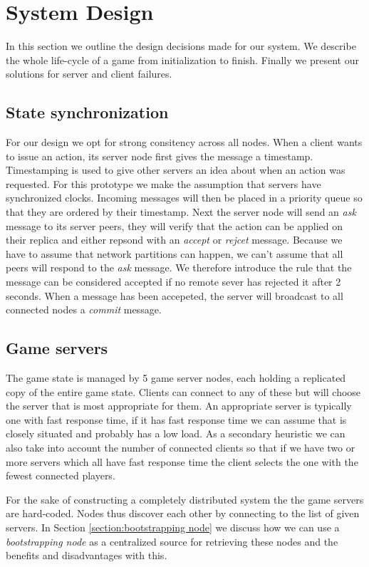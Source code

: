 \documentclass[a4paper]{article}
\begin{document}
\section{System Design}
In this section we outline the design decisions made for our system. We describe the whole life-cycle of a game from initialization to finish. Finally we present our solutions for server and client failures.

\subsection{State synchronization}\label{design state synchronization}
For our design we opt for strong consitency across all nodes. When a client wants to issue an action, its server node first gives the message a timestamp. Timestamping is used to give other servers an idea about when an action was requested. For this prototype we make the assumption that servers have synchronized clocks. Incoming messages will then be placed in a priority queue so that they are ordered by their timestamp. Next the server node will send an \emph{ask} message to its server peers, they will verify that the action can be applied on their replica and either repsond with an \emph{accept} or \emph{rejcet} message. Because we have to assume that network partitions can happen, we can't assume that all peers will respond to the \emph{ask} message. We therefore introduce the rule that the message can be considered accepted if no remote sever has rejected it after 2 seconds. When a message has been accepeted, the server will broadcast to all connected nodes a \emph{commit} message. 

\subsection{Game servers}
The game state is managed by 5 game server nodes, each holding a replicated copy of the entire game state. Clients can connect to any of these but will choose the server that is most appropriate for them. An appropriate server is typically one with fast response time, if it has fast response time we can assume that is closely situated and probably has a low load. As a secondary heuristic we can also take into account the number of connected clients so that if we have two or more servers which all have fast response time the client selects the one with the fewest connected players. 

For the sake of constructing a completely distributed system the the game servers are hard-coded. Nodes thus discover each other by connecting to the list of given servers. In Section \ref{section:bootstrapping node} we discuss how we can use a \emph{bootstrapping node} as a centralized source for retrieving these nodes and the benefits and disadvantages with this. 
\end{document}
